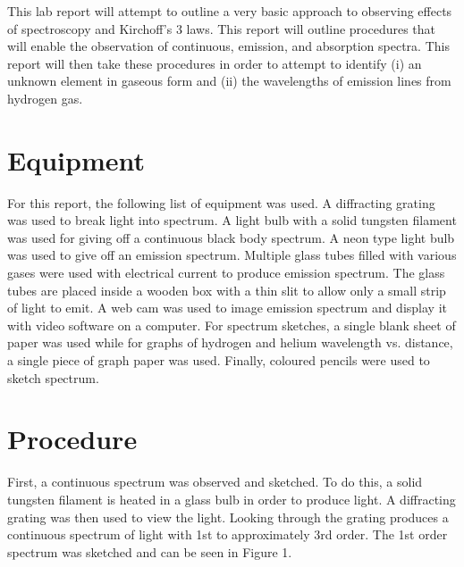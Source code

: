 \documentclass{article}
\begin{document}
This lab report will attempt to outline a very basic approach to observing effects 
of spectroscopy and Kirchoff's 3 laws. This report will outline procedures that
will enable the observation of continuous, emission, and absorption spectra. This
report will then take these procedures in order to attempt to identify (i) an unknown
element in gaseous form and (ii) the wavelengths of emission lines from hydrogen
gas.


\section{Equipment}

For this report, the following list of equipment was used. A diffracting grating was used
to break light into spectrum. A light bulb with a solid tungsten filament was
used for giving off a continuous black body spectrum. A neon type light bulb was 
used to give off an emission spectrum. Multiple glass tubes filled with
various gases were used with electrical current to produce emission spectrum. 
The glass tubes are placed inside a wooden box with a thin slit to allow only
a small strip of light to emit. A web cam
was used to image emission spectrum and display it with video software on a computer.
For spectrum sketches, a single blank sheet of paper was used while for graphs
of hydrogen and helium wavelength vs. distance, a single piece of graph paper was used.
Finally, coloured pencils were used to sketch spectrum.


\section{Procedure}

First, a continuous spectrum was observed and sketched. To do this, a solid tungsten 
filament is heated in a glass bulb in order to produce light. A diffracting grating was
then used to view the light. Looking through the grating produces a continuous 
spectrum of light with 1st to approximately 3rd order. The 1st order spectrum was 
sketched and can be seen in Figure 1.\\
\end{document}
